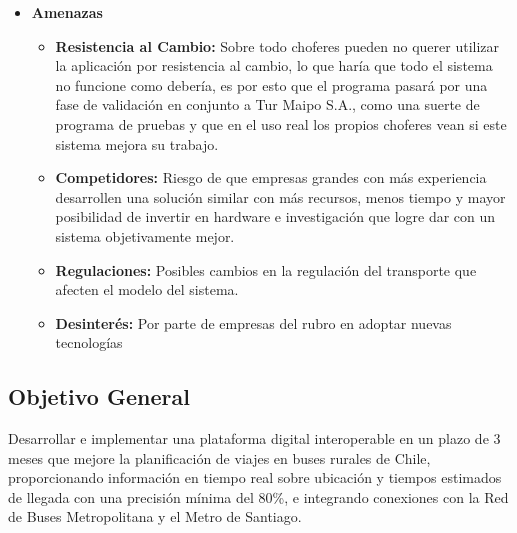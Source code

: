 \documentclass[12pt]{article}
\begin{document}
\begin{itemize}
\begin{itemize}
        \item \textbf{Dependencia: }El proyecto depende de la conexión a internet de los celulares y su servicio de ubicación gps, lo que puede llevar a un mal funcionamiento.
        \item \textbf{Validación Restringida:} Es bueno que una empresa valide el proyecto, sin embargo no es representativo a todas las empresas de buses rurales, el éxito en Tur Maipo S.A. no asegura el éxito total del sistema.
    \end{itemize}
    \item \textbf{Amenazas}
    \begin{itemize}
        \item \textbf{Resistencia al Cambio:} Sobre todo choferes pueden no querer utilizar la aplicación por resistencia al cambio, lo que haría que todo el sistema no funcione como debería, es por esto que el programa pasará por una fase de validación en conjunto a Tur Maipo S.A., como una suerte de programa de pruebas y que en el uso real los propios choferes vean si este sistema mejora su trabajo.
        \item \textbf{Competidores:} Riesgo de que empresas grandes con más experiencia desarrollen una solución similar con más recursos, menos tiempo y mayor posibilidad de invertir en hardware e investigación que logre dar con un sistema objetivamente mejor.
        \item \textbf{Regulaciones:} Posibles cambios en la regulación del transporte que afecten el modelo del sistema.
        \item \textbf{Desinterés:} Por parte de empresas del rubro en adoptar nuevas tecnologías
    \end{itemize}
    
    \end{itemize}
    \newpage
\subsection{Objetivo General}
Desarrollar e implementar una plataforma digital interoperable en un plazo de 3 meses que mejore la planificación de viajes en buses rurales de Chile, proporcionando información en tiempo real sobre ubicación y tiempos estimados de llegada con una precisión mínima del 80\%, e integrando conexiones con la Red de Buses Metropolitana y el Metro de Santiago.
\end{document}
